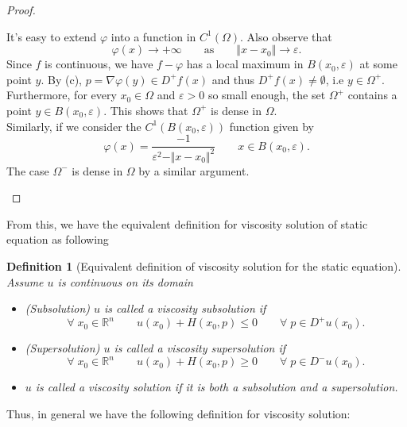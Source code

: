 \documentclass[12pt, oneside]{amsart}  	%
\newtheorem{definition}{Definition}
\begin{document}
\begin{proof}
\begin{itemize}
It's easy to extend $\varphi$ into a function in $C^1(\Omega)$. Also observe that 
\begin{equation*}
\varphi(x) \longrightarrow +\infty \qquad\text{as}\qquad \Vert x-x_0\Vert\longrightarrow \varepsilon.
\end{equation*}
Since $f$ is continuous, we have $f-\varphi$ has a local maximum in $B(x_0,\varepsilon)$ at some point $y$. By (c), $p = \nabla \varphi(y)\in D^+f(x)$ and thus $D^+f(x)\neq \emptyset$, i.e $y\in \Omega^+$. Furthermore, for every $x_0\in \Omega$ and $\varepsilon>0$ so small enough, the set $\Omega^+$ contains a point $y\in B(x_0,\varepsilon)$. This shows that $\Omega^+$ is dense in $\Omega$.\\
Similarly, if we consider the $C^1(B(x_0,\varepsilon))$ function given by
\begin{equation*}
\varphi(x) = \frac{-1}{\varepsilon^2 - \Vert x-x_0\Vert^2} \qquad x\in B(x_0,\varepsilon).
\end{equation*}
The case $\Omega^-$ is dense in $\Omega$ by a similar argument.
\end{itemize}
\end{proof}
















From this, we have the equivalent definition for viscosity solution of static equation as following

\begin{definition} [Equivalent definition of viscosity solution for the static equation] Assume $u$ is continuous on its domain
\begin{itemize}
\item (Subsolution) $u$ is called a viscosity subsolution if
$$ \forall\;x_0\in \mathbb{R}^n\qquad  u(x_0) + H(x_0, p)\le 0 \qquad \forall\; p\in D^+u(x_0).$$
\item (Supersolution) $u$ is called a viscosity supersolution if $$ \forall\;x_0\in \mathbb{R}^n\qquad  u(x_0) + H(x_0, p)\ge 0 \qquad \forall\; p\in D^-u(x_0).$$
\item $u$ is called a viscosity solution if it is both a subsolution and a supersolution.
\end{itemize}
\end{definition}

Thus, in general we have the following definition for viscosity solution:
\end{document}
